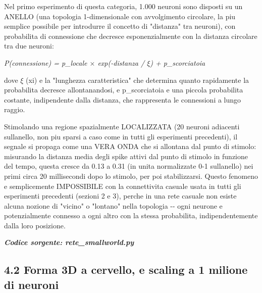 \documentclass[
  italian,
]{article}
\begin{document}
Nel primo esperimento di questa categoria, 1.000 neuroni sono disposti su un ANELLO (una topologia 1-dimensionale con avvolgimento circolare, la piu\textquotesingle{} semplice possibile per introdurre il concetto di "distanza" tra neuroni), con probabilita\textquotesingle{} di connessione che decresce esponenzialmente con la distanza circolare tra due neuroni:

\emph{P(connessione) = p\_\allowbreak{}locale $\times$ exp(-distanza / $\xi$) + p\_\allowbreak{}scorciatoia}

dove $\xi$ (xi) e\textquotesingle{} la "lunghezza caratteristica" che determina quanto rapidamente la probabilita\textquotesingle{} decresce allontanandosi, e p\_\allowbreak{}scorciatoia e\textquotesingle{} una piccola probabilita\textquotesingle{} costante, indipendente dalla distanza, che rappresenta le connessioni a lungo raggio.

Stimolando una regione spazialmente LOCALIZZATA (20 neuroni adiacenti sull\textquotesingle anello, non piu\textquotesingle{} sparsi a caso come in tutti gli esperimenti precedenti), il segnale si propaga come una VERA ONDA che si allontana dal punto di stimolo: misurando la distanza media degli spike attivi dal punto di stimolo in funzione del tempo, questa cresce da 0.13 a 0.31 (in unita\textquotesingle{} normalizzate 0-1 sull\textquotesingle anello) nei primi circa 20 millisecondi dopo lo stimolo, per poi stabilizzarsi. Questo fenomeno e\textquotesingle{} semplicemente IMPOSSIBILE con la connettivita\textquotesingle{} casuale usata in tutti gli esperimenti precedenti (sezioni 2 e 3), perche\textquotesingle{} in una rete casuale non esiste alcuna nozione di "vicino" o "lontano" nella topologia -\/- ogni neurone e\textquotesingle{} potenzialmente connesso a ogni altro con la stessa probabilita\textquotesingle, indipendentemente dalla loro posizione.

\textit{\textbf{Codice sorgente: rete\_\allowbreak{}smallworld.py}}


\subsection{4.2 Forma 3D a cervello, e scaling a 1 milione di neuroni}\label{forma-3d-a-cervello-e-scaling-a-1-milione-di-neuroni}
\end{document}
